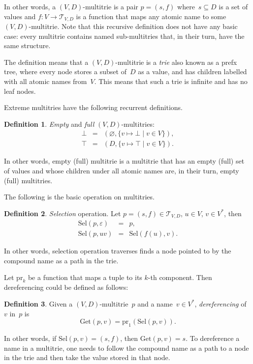 \documentclass{article}
\theoremstyle{definition}
\newtheorem{Df}{Definition}
\newcommand{\setcharmt}{T}
\newcommand{\setsymbol}[3]{\mathcal{#1}_{#2,#3}}
\newcommand{\setmt}[2]{\setsymbol{\setcharmt}{#1}{#2}}
\newcommand{\select}{\mathrm{Sel}}
\newcommand{\proj}[1]{\mathrm{pr}_{#1}}
\newcommand{\derefsymbol}{\mathrm{Get}}
\newcommand{\deref}[2]{\derefsymbol(#1, #2)}
\begin{document}
In other words, a $(V,D)$-multitrie is a pair $p = (s, f)$ where~$s\subseteq D$
is a set of values and $f: V \to \setmt{V}{D}$ is a function that maps any
atomic name to some $(V,D)$-multitrie. Note that this recursive definition does
not have any basic case: every multitrie contains named sub-multitries that, in
their turn, have the same structure.

The definition means that a $(V,D)$-multitrie is a \emph{trie} also known as
a prefx tree, where every node stores a subset of~$D$ as a value, and has
children labelled with all atomic names from~$V$. This means that such a trie
is infinite and has no leaf nodes.

Extreme multitries have the following recurrent definitions.
\begin{Df}\label{df:mt-extreme}
\emph{Empty} and \emph{full} $(V,D)$-multitries:
\begin{eqnarray*}
  \bot & = & ( \varnothing, \{ v \mapsto \bot \mid v\in V \} ) , \\
  \top & = & ( D,           \{ v \mapsto \top \mid v\in V \} ) .
\end{eqnarray*}
\end{Df}
In other words, empty (full) multitrie is a multitrie that has an empty
(full) set of values and whose children under all atomic names are, in their
turn, empty (full) multitries.

The following is the basic operation on multitries.
\begin{Df}\label{df:mt-select}
\emph{Selection} operation. Let $p=(s,f) \in \setmt{V}{D}$, $u\in V$,
$v\in V^\ast$, then
\begin{eqnarray*}
  \select(p, \varepsilon) & = & p , \\
  \select(p, u v) & = & \select(f(u), v) .
\end{eqnarray*}
\end{Df}

In other words, selection operation traverses finds a node pointed to by the
compound name as a path in the trie.

Let $\proj{k}$ be a function that maps a tuple to its $k$-th component.
Then dereferencing could be defined as follows:
\begin{Df}\label{df:mt-deref}
Given a $(V,D)$-multitrie~$p$ and a name~$v\in V^\ast$, \emph{dereferencing}
of~$v$ in~$p$ is
\[
  \deref{p}{v} = \proj{1}(\select(p, v)) .
\]
\end{Df}

In other words, if $\select(p,v) = (s,f)$, then $\deref{p}{v} = s$. To
dereference a name in a multitrie, one needs to follow the compound name
as a path to a node in the trie and then take the value stored in that node.
\end{document}
